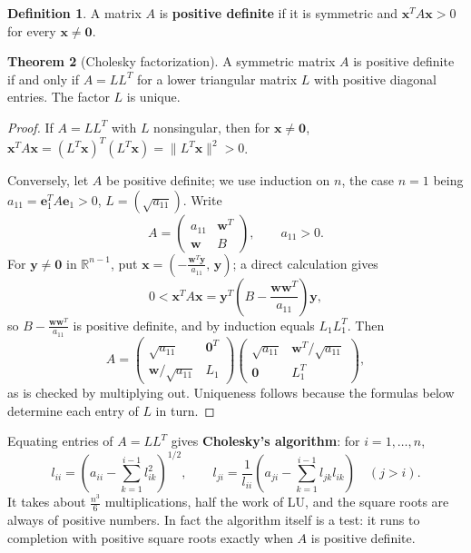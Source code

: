 \documentclass[11pt,a4paper]{article}
\numberwithin{equation}{section}
\theoremstyle{definition}
\newtheorem{thm}{Theorem}[subsection]
\newtheorem{defn}[thm]{Definition}
\begin{document}
\begin{defn}
A matrix $A$ is \textbf{positive definite} if it is symmetric and $\mathbf x^TA\mathbf x>0$ for every $\mathbf x\neq\mathbf 0$.
\end{defn}

\begin{thm}[Cholesky factorization]
\label{thm:cholesky}
A symmetric matrix $A$ is positive definite if and only if $A = LL^T$ for a lower triangular matrix $L$ with positive diagonal entries.
The factor $L$ is unique.
\end{thm}

\begin{proof}
If $A = LL^T$ with $L$ nonsingular, then for $\mathbf x\neq\mathbf 0$, $\mathbf x^TA\mathbf x = (L^T\mathbf x)^T(L^T\mathbf x) = \|L^T\mathbf x\|^2>0$.

Conversely, let $A$ be positive definite; we use induction on $n$, the case $n = 1$ being $a_{11} = \mathbf e_1^TA\mathbf e_1>0$,
$L = (\sqrt{a_{11}})$. Write
$$A = \begin{pmatrix}a_{11}&\mathbf w^T\\ \mathbf w&B\end{pmatrix},\qquad a_{11}>0 .$$
For $\mathbf y\neq\mathbf 0$ in $\mathbb R^{n-1}$, put $\mathbf x = \left(-\frac{\mathbf w^T\mathbf y}{a_{11}},\,\mathbf y\right)$; a direct calculation gives
$$0<\mathbf x^TA\mathbf x = \mathbf y^T\left(B-\frac{\mathbf w\mathbf w^T}{a_{11}}\right)\mathbf y ,$$
so $B-\frac{\mathbf w\mathbf w^T}{a_{11}}$ is positive definite, and by induction equals $L_1L_1^T$. Then
$$A = \begin{pmatrix}\sqrt{a_{11}}&\mathbf 0^T\\ \mathbf w/\sqrt{a_{11}}&L_1\end{pmatrix}\begin{pmatrix}\sqrt{a_{11}}&\mathbf w^T/\sqrt{a_{11}}\\ \mathbf 0&L_1^T\end{pmatrix},$$
as is checked by multiplying out. Uniqueness follows because the formulas below determine each entry of $L$ in turn.
\end{proof}

Equating entries of $A = LL^T$ gives \textbf{Cholesky's algorithm}: for $i = 1,\dots,n$,
$$l_{ii} = \left(a_{ii}-\sum_{k=1}^{i-1}l_{ik}^2\right)^{1/2},\qquad l_{ji} = \frac{1}{l_{ii}}\left(a_{ji}-\sum_{k=1}^{i-1}l_{jk}l_{ik}\right)\quad(j>i).$$
It takes about $\frac{n^3}{6}$ multiplications, half the work of LU, and the square roots are always of positive numbers. In fact the
algorithm itself is a test: it runs to completion with positive square roots exactly when $A$ is positive definite.
\end{document}
